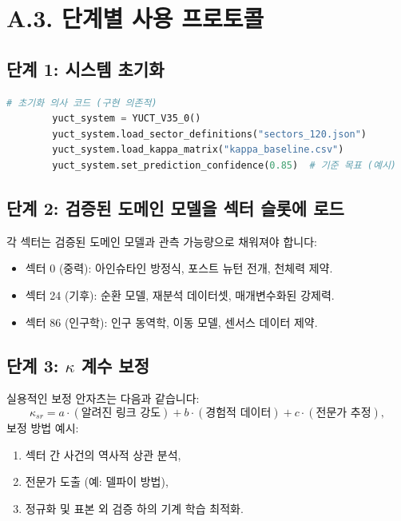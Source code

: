 \documentclass[13pt,a4paper]{article}
\begin{document}
	\section*{A.3. 단계별 사용 프로토콜}
	
	\subsection*{단계 1: 시스템 초기화}
	\begin{lstlisting}[language=Python]
		# 초기화 의사 코드 (구현 의존적)
		yuct_system = YUCT_V35_0()
		yuct_system.load_sector_definitions("sectors_120.json")
		yuct_system.load_kappa_matrix("kappa_baseline.csv")
		yuct_system.set_prediction_confidence(0.85)  # 기준 목표 (예시)
	\end{lstlisting}
	
	\subsection*{단계 2: 검증된 도메인 모델을 섹터 슬롯에 로드}
	각 섹터는 검증된 도메인 모델과 관측 가능량으로 채워져야 합니다:
	\begin{itemize}[leftmargin=*]
		\item 섹터 0 (중력): 아인슈타인 방정식, 포스트 뉴턴 전개, 천체력 제약.
		\item 섹터 24 (기후): 순환 모델, 재분석 데이터셋, 매개변수화된 강제력.
		\item 섹터 86 (인구학): 인구 동역학, 이동 모델, 센서스 데이터 제약.
	\end{itemize}
	
	\subsection*{단계 3: $\kappa$ 계수 보정}
	실용적인 보정 안자츠는 다음과 같습니다:
	\[
	\kappa_{sr} = a\cdot (\text{알려진 링크 강도}) + b\cdot (\text{경험적 데이터}) + c\cdot (\text{전문가 추정}),
	\]
	보정 방법 예시:
	\begin{enumerate}[leftmargin=*]
		\item 섹터 간 사건의 역사적 상관 분석,
		\item 전문가 도출 (예: 델파이 방법),
		\item 정규화 및 표본 외 검증 하의 기계 학습 최적화.
	\end{enumerate}
	
\end{document}
